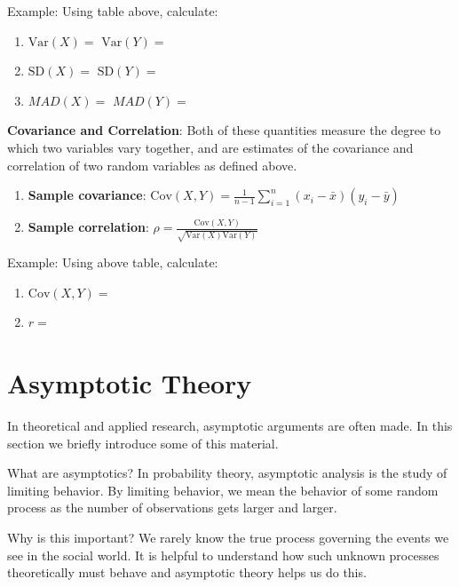 \documentclass[]{book}
\providecommand{\tightlist}{%
  \setlength{\itemsep}{0pt}\setlength{\parskip}{0pt}}
\newcommand{\Var}{\mathrm{Var}}
\newcommand{\SD}{\mathrm{SD}}
\newcommand{\Cov}{\mathrm{Cov}}
\theoremstyle{definition}
\theoremstyle{definition}
\theoremstyle{definition}
\theoremstyle{remark}
\begin{document}
\begin{framed}
Example: Using table above, calculate: 
\begin{enumerate}
\item $\Var(X) = $ \hspace{1.5cm} $\Var(Y) = $
\item $\SD(X) = $ \hspace{1.65cm} $\SD(Y) = $
\item $MAD(X) = $ \hspace{1.1cm} $MAD(Y) = $
\end{enumerate}
\end{framed}

\textbf{Covariance and Correlation}: Both of these quantities measure
the degree to which two variables vary together, and are estimates of
the covariance and correlation of two random variables as defined above.

\begin{enumerate}
\def\labelenumi{\arabic{enumi}.}
\tightlist
\item
  \textbf{Sample covariance}:
  \(\Cov(X,Y) = \frac{1}{n-1}\sum_{i = 1}^n(x_i - \bar{x})(y_i - \bar{y})\)
\item
  \textbf{Sample correlation}:
  \(\rho = \frac{\Cov(X,Y)}{\sqrt{\Var(X)\Var(Y)}}\)
\end{enumerate}

\begin{framed}
Example:  Using above table, calculate:
\begin{enumerate}
\item $\Cov(X,Y) = $
\item $r = $
\end{enumerate}
\end{framed}

\section{Asymptotic Theory}\label{asymptotic-theory}

In theoretical and applied research, asymptotic arguments are often
made. In this section we briefly introduce some of this material.

What are asymptotics? In probability theory, asymptotic analysis is the
study of limiting behavior. By limiting behavior, we mean the behavior
of some random process as the number of observations gets larger and
larger.

Why is this important? We rarely know the true process governing the
events we see in the social world. It is helpful to understand how such
unknown processes theoretically must behave and asymptotic theory helps
us do this.
\end{document}

